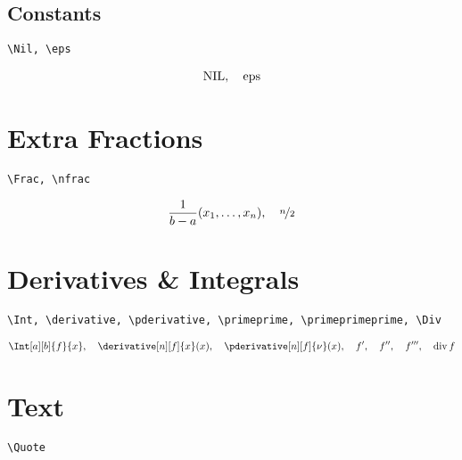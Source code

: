 \documentclass{article}
\begin{document}
\subsection{Constants}

\verb|\Nil, \eps|

\begin{align*}
    \NIL,
    \quad
    \eps
\end{align*}


\section{Extra Fractions}

\verb|\Frac, \nfrac|

\begin{align*}
    \Frac{x_1, \dots, x_n}{b - a},
    \quad
    \nfrac{n}{2}
\end{align*}


\section{Derivatives \& Integrals}

\verb|\Int, \derivative, \pderivative, \primeprime, \primeprimeprime, \Div|

\begin{align*}
    \Int[a][b]{f}{x},
    \quad
    \derivative[n][f]{x}(x),
    \quad
    \pderivative[n][f]{\nu}(x),
    \quad
    f^\prime,
    \quad
    f^\primeprime,
    \quad
    f^\primeprimeprime,
    \quad
    \Div f
\end{align*}


\section{Text}

\verb|\Quote|

\begin{center}
\end{center}


\printbibliography
\end{document}
